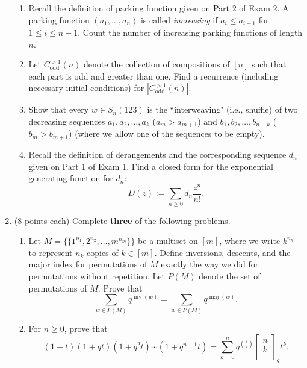 \documentclass[11pt]{article}
\theoremstyle{definition}
\DeclareMathOperator{\inv}{inv}
\DeclareMathOperator{\maj}{maj}
\newcommand{\qbinom}[2]{
  \displaystyle \left[\begin{matrix}#1  \\#2  \\ \end{matrix}\right]}
\begin{document}
\begin{enumerate}
\begin{enumerate}

\item Recall the definition of parking function given on Part 2 of Exam 2.  A parking function $(a_1,\ldots,a_n)$ is called \emph{increasing} if $a_i\leq a_{i+1}$ for $1\leq i\leq n-1$. Count the number of increasing parking functions of length $n$.

\item Let $C^{>1}_{\text{odd}}(n)$ denote the collection of compositions of $[n]$  such that each part is odd and greater than one. Find a recurrence (including necessary initial conditions) for $|C^{>1}_{\text{odd}}(n)|$.

\item Show that every $w\in S_n(123)$ is the ``interweaving" (i.e., shuffle) of two decreasing sequences $a_1,a_2,\ldots, a_k$ ($a_m>a_{m+1}$) and $b_1,b_2,\ldots,b_{n-k}$ ($b_m>b_{m+1}$) (where we allow one of the sequences to be empty).

\item Recall the definition of derangements and the corresponding sequence $d_n$ given on Part 1 of Exam 1. Find a closed form for the exponential generating function for $d_n$:
\[
D(z):=\sum_{n\geq 0}d_n\frac{z^n}{n!}.
\]

\end{enumerate}

\item (8 points each) Complete \textbf{three} of the following problems.

\begin{enumerate}

\item Let $M= \{\{1^{n_1},2^{n_2},\ldots,m^{n_m}\}\}$ be a multiset on $[m]$, where we write $k^{n_k}$ to represent $n_k$ copies of $k\in[m]$. Define inversions, descents, and the major index for permutations of $M$ exactly the way we did for permutations without repetition. Let $P(M)$ denote the set of permutations of $M$. Prove that
\[
\sum_{w\in P(M)}q^{\inv(w)}=\sum_{w\in P(M)}q^{\maj(w)}.
\]


\item For $n\geq 0$, prove that
\[
(1+t)(1+qt)(1+q^2t)\cdots (1+q^{n-1}t)=\sum_{k=0}^nq^{\binom{k}{2}}\qbinom{n}{k}_qt^k.
\]


\end{enumerate}
\end{enumerate}
\end{document}
